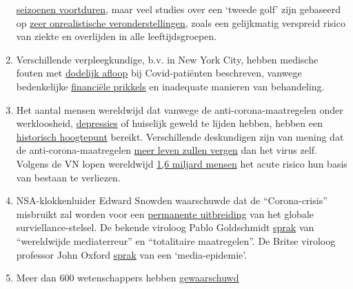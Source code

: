 \begin{enumerate}
  \href{https://www.britannica.com/event/1968-flu-pandemic}{seizoenen
  voortduren}, maar veel studies over een `tweede golf' zijn gebaseerd
  op
  \href{https://www.heise.de/tp/features/Fellay-Studie-Zweite-Corona-Welle-4726303.html}{zeer
  onrealistische veronderstellingen}, zoals een gelijkmatig verspreid
  risico van ziekte en overlijden in alle leeftijdsgroepen.
\item
  Verschillende verpleegkundige, b.v. in New York City, hebben medische
  fouten met \href{https://www.youtube.com/watch?v=UIDsKdeFOmQ}{dodelijk
  afloop} bij Covid-patiënten beschreven, vanwege bedenkelijke
  \href{https://eu.usatoday.com/story/news/factcheck/2020/04/24/fact-check-medicare-hospitals-paid-more-covid-19-patients-coronavirus/3000638001/}{financiële
  prikkels} en inadequate manieren van behandeling.
\item
  Het aantal mensen wereldwijd dat vanwege de anti-corona-maatregelen
  onder werkloosheid,
  \href{https://www.indystar.com/story/news/health/2020/04/03/coronavirus-indiana-how-get-help-mental-health-addiction/5104357002/}{depressies}
  of huiselijk geweld te lijden hebben, hebben een
  \href{https://www.businessinsider.com/us-weekly-jobless-claims-unemployment-filings-coronavirus-labor-market-layoffs-2020-5}{historisch
  hoogtepunt} bereikt. Verschillende deskundigen zijn van mening dat de
  anti-corona-maatregelen
  \href{https://www.nytimes.com/2020/03/20/opinion/coronavirus-pandemic-social-distancing.html}{meer
  leven zullen vergen} dan het virus zelf. Volgens de VN lopen
  wereldwijd
  \href{https://www.theguardian.com/world/2020/apr/29/half-of-worlds-workers-at-immediate-risk-of-losing-livelihood-due-to-coronavirus}{1,6
  miljard mensen} het acute risico hun basis van bestaan te verliezen.
\item
  NSA-klokkenluider Edward Snowden waarschuwde dat de ``Corona-crisis''
  misbruikt zal worden voor een
  \href{https://www.youtube.com/watch?v=-pcQFTzck_c}{permanente
  uitbreiding} van het globale surviellance-stelsel. De bekende viroloog
  Pablo Goldschmidt
  \href{https://www.rubikon.news/artikel/der-corona-totalitarismus}{sprak}
  van ``wereldwijde mediaterreur'' en ``totalitaire maatregelen''. De
  Britse viroloog professor John Oxford
  \href{https://novuscomms.com/2020/03/31/a-view-from-the-hvivo-open-orphan-orph-laboratory-professor-john-oxford/}{sprak}
  van een `media-epidemie'.
\item
  Meer dan 600 wetenschappers hebben
  \href{https://www.esat.kuleuven.be/cosic/sites/contact-tracing-joint-statement/}{gewaarschuwd}

\end{enumerate}

